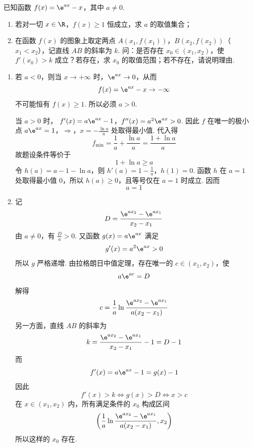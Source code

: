 \begin{problem}
已知函数 \(f(x)=\e^{ax}-x\)，其中 \(a\neq0\).

\begin{enumerate}
\item 若对一切 \(x\in\R\)，\(f(x)\geqslant1\) 恒成立，求 \(a\) 的取值集合；
\item 在函数 \(f(x)\) 的图象上取定两点 \(A(x_1,f(x_1))\)，\(B(x_2,f(x_2))\)（\(x_1<x_2\)），记直线 \(AB\) 的斜率为 \(k\). 问：是否存在 \(x_0\in(x_1,x_2)\)，使 \(f'(x_0)>k\) 成立？若存在，求 \(x_0\) 的取值范围；若不存在，请说明理由.
\end{enumerate}

\begin{solution}
\begin{enumerate}
\item 若 \(a<0\)，则当 \(x\to+\infty\) 时，\(\e^{ax}\to0\)，从而
\[
f(x)=\e^{ax}-x\to-\infty
\]
不可能恒有 \(f(x)\geqslant1\). 所以必须 \(a>0\).

当 \(a>0\) 时，
\(f'(x)=a\e^{ax}-1\)，\(f''(x)=a^2\e^{ax}>0\).
因此 \(f\) 在唯一的极小点
\(a\e^{ax}=1\)，\(\Longrightarrow\)，\(x=-\frac{\ln a}{a}\)
处取得最小值. 代入得
\[
f_{\min}=\frac1a+\frac{\ln a}{a}
=\frac{1+\ln a}{a}
\]
故题设条件等价于
\[
1+\ln a\geqslant a
\]
令 \(h(a)=a-1-\ln a\)，则
\(h'(a)=1-\frac1a\)，\(h(1)=0\).
函数 \(h\) 在 \(a=1\) 处取得最小值 \(0\)，所以 \(h(a)\geqslant0\)，且等号仅在 \(a=1\) 时成立. 因而
\[
a=1
\]

\item 记
\[
D=\frac{\e^{ax_2}-\e^{ax_1}}{x_2-x_1}
\]
由 \(a\neq0\)，有 \(\frac{D}{a}>0\). 又函数 \(g(x)=a\e^{ax}\) 满足
\[
g'(x)=a^2\e^{ax}>0
\]
所以 \(g\) 严格递增. 由拉格朗日中值定理，存在唯一的 \(c\in(x_1,x_2)\)，使
\[
a\e^{ac}=D
\]
解得
\[
c=\frac1a\ln\frac{\e^{ax_2}-\e^{ax_1}}{a(x_2-x_1)}
\]
另一方面，直线 \(AB\) 的斜率为
\[
k=\frac{\e^{ax_2}-\e^{ax_1}}{x_2-x_1}-1=D-1
\]
而
\[
f'(x)=a\e^{ax}-1=g(x)-1
\]
因此
\[
f'(x)>k
\iff g(x)>D
\iff x>c
\]
在 \(x\in(x_1,x_2)\) 内，所有满足条件的 \(x_0\) 构成区间
\[
\left(
\frac1a\ln\frac{\e^{ax_2}-\e^{ax_1}}{a(x_2-x_1)},
x_2
\right)
\]
所以这样的 \(x_0\) 存在.
\end{enumerate}
\end{solution}
\end{problem}
